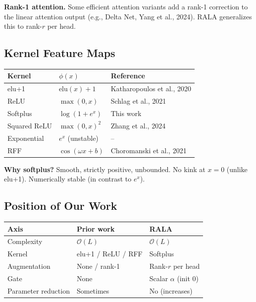 \textbf{Rank-1 attention.} Some efficient attention variants add a rank-1 
correction to the linear attention output (e.g., Delta Net, Yang et al., 
2024). RALA generalizes this to rank-$r$ per head.

\subsection{Kernel Feature Maps}

\begin{table}[H]
\centering
\small
\begin{tabular}{lll}
\toprule
\textbf{Kernel} & \textbf{$\phi(x)$} & \textbf{Reference} \\
\midrule
elu+1 & $\mathrm{elu}(x) + 1$ & Katharopoulos et al., 2020 \\
ReLU & $\max(0, x)$ & Schlag et al., 2021 \\
Softplus & $\log(1 + e^x)$ & This work \\
Squared ReLU & $\max(0, x)^2$ & Zhang et al., 2024 \\
Exponential & $e^x$ (unstable) & -- \\
RFF & $\cos(\omega x + b)$ & Choromanski et al., 2021 \\
\bottomrule
\end{tabular}
\end{table}

\textbf{Why softplus?} Smooth, strictly positive, unbounded. No kink at $x = 0$ 
(unlike elu+1). Numerically stable (in contrast to $e^x$).

\subsection{Position of Our Work}

\begin{table}[H]
\centering
\small
\begin{tabular}{lll}
\toprule
\textbf{Axis} & \textbf{Prior work} & \textbf{RALA} \\
\midrule
Complexity & $\mathcal{O}(L)$ & $\mathcal{O}(L)$ \\
Kernel & elu+1 / ReLU / RFF & Softplus \\
Augmentation & None / rank-1 & Rank-$r$ per head \\
Gate & None & Scalar $\alpha$ (init 0) \\
Parameter reduction & Sometimes & No (increases) \\
\bottomrule
\end{tabular}
\end{table}

